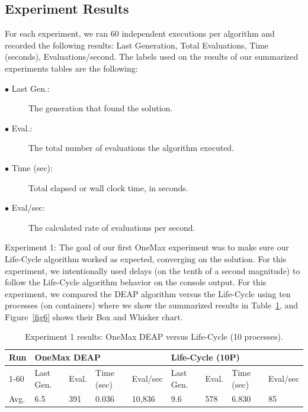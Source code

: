 \documentclass[runningheads]{llncs}
\begin{document}
\subsection{Experiment Results}

For each experiment, we ran 60 independent executions per algorithm and
recorded the following results: Last Generation, Total Evaluations, Time
(seconds), Evaluations/second. The labels used on the results of our summarized
experiments tables are the following:

\begin{description}  %
    \item[$\bullet$ Last Gen.:] The generation that found the solution.
    \item[$\bullet$ Eval.:] The total number of evaluations the algorithm executed. 
    \item[$\bullet$ Time (sec):] Total elapsed or wall clock time, in seconds. 
    \item[$\bullet$ Eval/sec:] The calculated rate of evaluations per second.
\end{description}


Experiment 1: The goal of our first OneMax experiment was to make sure our
Life-Cycle algorithm worked as expected, converging on the solution. For this
experiment, we intentionally used delays (on the tenth of a second magnitude)
to follow the Life-Cycle algorithm behavior on the console output. For this
experiment, we compared the DEAP algorithm versus the Life-Cycle using ten
processes (on containers) where we show the summarized results in Table~\ref{tab2}, and
Figure~\ref{fig6} shows their Box and Whisker chart.

\begin{table}[]
    \centering        
    \caption{Experiment 1 results: OneMax DEAP versus Life-Cycle (10 processes).}\label{tab2}
    \begin{tabular}{|l|l|l|l|l|l|l|l|l|}
    \hline
    Run & \multicolumn{4}{l|}{OneMax DEAP} & \multicolumn{4}{l|}{Life-Cycle (10P)} \\ \hline
    1-60 & Last Gen. & Eval. & Time (sec) & Eval/sec & Last Gen. & Eval. & Time (sec) & Eval/sec \\ \hline
    Avg. & 6.5 & 391 & 0.036 & 10,836 & 9.6 & 578 & 6.830 & 85 \\ \hline
    \end{tabular}
    \end{table}
\end{document}
